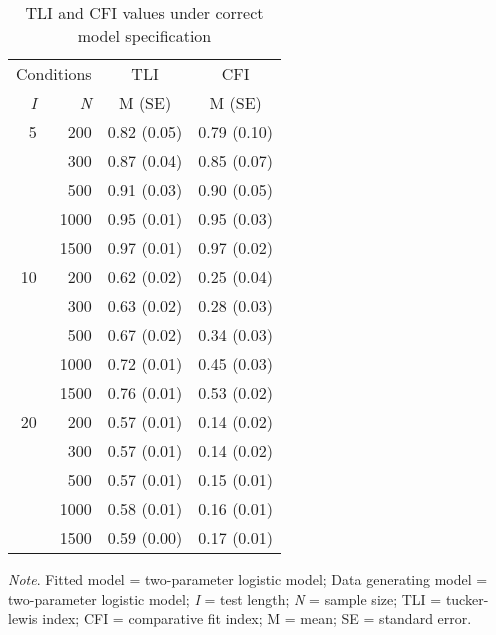 \documentclass[Royal,sageapa,times,doublespace]{Manuscript-Files/sagej}
\begin{document}
\begin{table}[ht]
\caption{TLI and CFI values under correct model specification}
\begin{tabular}{ r r | c c }
\toprule
\multicolumn{2}{c}{Conditions} & \multicolumn{1}{c}{TLI} & \multicolumn{1}{c}{CFI} \\
\textit{I} & \textit{N} & M (SE) & M (SE) \\
\midrule
 5 & 200 & 0.82 (0.05) & 0.79 (0.10) \\
& 300 & 0.87 (0.04) & 0.85 (0.07) \\
& 500 & 0.91 (0.03) & 0.90 (0.05) \\
& 1000 & 0.95 (0.01) & 0.95 (0.03) \\
& 1500 & 0.97 (0.01) & 0.97 (0.02) \\
10 & 200 & 0.62 (0.02) & 0.25 (0.04) \\
& 300 & 0.63 (0.02) & 0.28 (0.03)\\
& 500 & 0.67 (0.02) & 0.34 (0.03) \\
& 1000 & 0.72 (0.01) & 0.45 (0.03) \\
& 1500 & 0.76 (0.01) & 0.53 (0.02)\\
20 & 200 & 0.57 (0.01) & 0.14 (0.02) \\
& 300 & 0.57 (0.01) & 0.14 (0.02) \\
& 500 & 0.57 (0.01) & 0.15 (0.01)\\
& 1000 & 0.58 (0.01) & 0.16 (0.01) \\
& 1500 & 0.59 (0.00) & 0.17 (0.01) \\
\bottomrule
\end{tabular}

\bigskip
\small\textit{Note}. Fitted model = two-parameter logistic model; Data generating model = two-parameter logistic model; \textit{I} = test length; \textit{N} = sample size; TLI = tucker-lewis index; CFI = comparative fit index; M = mean; SE = standard error.
\label{tab:4}
\end{table}

\newpage
\end{document}
